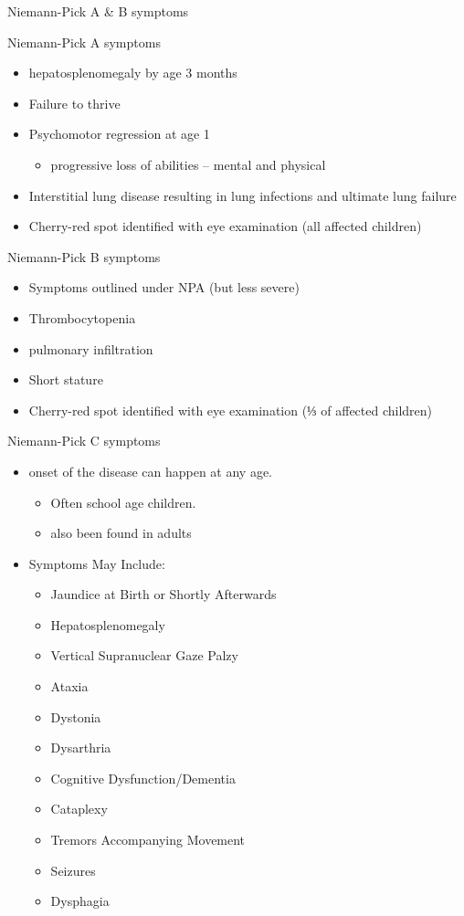 \documentclass[presentation, smaller]{beamer}
\begin{document}
\begin{frame}[label={sec:orgheadline11}]{Niemann-Pick A \& B symptoms}
\begin{block}{Niemann-Pick A symptoms}
\begin{itemize}
\item hepatosplenomegaly by age 3 months
\item Failure to thrive
\item Psychomotor regression at age 1
\begin{itemize}
\item progressive loss of abilities – mental and physical
\end{itemize}
\item Interstitial lung disease resulting in lung infections and ultimate lung failure
\item Cherry-red spot identified with eye examination (all affected children)
\end{itemize}
\end{block}

\begin{block}{Niemann-Pick B symptoms}
\begin{itemize}
\item Symptoms outlined under NPA (but less severe)
\item Thrombocytopenia
\item pulmonary infiltration
\item Short stature
\item Cherry-red spot identified with eye examination (⅓ of affected children)
\end{itemize}
\end{block}
\end{frame}


\begin{frame}[label={sec:orgheadline12}]{Niemann-Pick C symptoms}
\begin{itemize}
\item onset of the disease can happen at any age.
\begin{itemize}
\item Often school age children.
\item also been found in adults
\end{itemize}

\item Symptoms May Include:
\begin{itemize}
\item Jaundice at Birth or Shortly Afterwards
\item Hepatosplenomegaly
\item Vertical Supranuclear Gaze Palzy
\item Ataxia
\item Dystonia
\item Dysarthria
\item Cognitive Dysfunction/Dementia
\item Cataplexy
\item Tremors Accompanying Movement
\item Seizures
\item Dysphagia
\end{itemize}
\end{itemize}
\end{frame}
\end{document}
